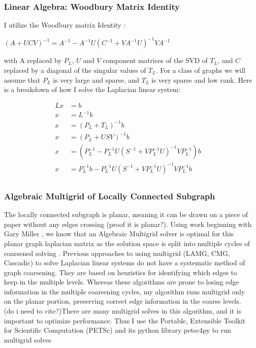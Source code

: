 \documentclass{article}
\begin{document}
\subsubsection{Linear Algebra: Woodbury Matrix Identity}
I utilize the Woodbury matrix Identity \cite{Woodbury:1950}:\\
\begin{center}
$(A+UCV)^{-1} = A^{-1} - A^{-1}U(C^{-1}+VA^{-1}U)^{-1}VA^{-1}$\\
\end{center}
with A replaced by $P_L$, $U$ and $V$ component matrices of the SVD of $T_L$, and $C$ replaced by a diagonal of the singular values of $T_L$. For a class of graphs we will assume that $P_L$ is very large and sparse, and $T_L$ is very sparse and low rank. Here is a breakdown of how I solve the Laplacian linear system:

\begin{align*}
Lx & = b\\
x & = L^{-1}b\\
x & = (P_L+T_L)^{-1}b\\
x & = (P_L+USV)^{-1}b\\
x & = (P_L^{-1}-P_L^{-1}U(S^{-1}+VP_L^{-1}U)^{-1}VP_L^{-1})b\\
x & = P_L^{-1}b-P_L^{-1}U(S^{-1}+VP_L^{-1}U)^{-1}VP_L^{-1}b\\
\end{align*}


\subsubsection{Algebraic Multigrid of Locally Connected Subgraph}
The locally connected subgraph is planar, meaning it can be drawn on a piece of paper without any edges crossing (proof it is planar?). Using work beginning with Gary Miller \cite{Miller:1995}, we know that an Algebraic Multigrid solver is optimal for this planar graph laplacian matrix as the solution space is split into multiple cycles of coarsened solving \cite{Brandt:1984}. Previous approaches to using multigrid (LAMG, CMG, Cascadic) to solve Laplacian linear systems do not have a systematic method of graph coarsening. They are based on heuristics for identifying which edges to keep in the multiple levels. Whereas these algorithms are prone to losing edge information in the multiple coarsening cycles, my algorithm runs multigrid only on the planar portion, preserving correct edge information in the coarse levels. (do i need to cite?)There are many multigrid solves in this algorithm, and it is important to optimize performance. Thus I use the Portable, Extensible Toolkit for Scientific Computation (PETSc) and its python library petsc4py to run multigrid solves \cite{petsc-user-ref, Dalcin:2011}
\end{document}
